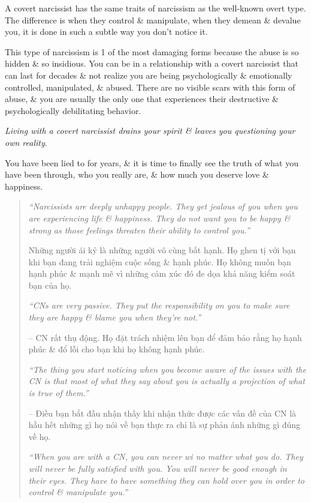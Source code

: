 \documentclass{article}
\begin{document}
\begin{enumerate}
	A covert narcissist has the same traits of narcissism as the well-known overt type. The difference is when they control \& manipulate, when they demean \& devalue you, it is done in such a subtle way you don't notice it.
	
	This type of narcissism is 1 of the most damaging forms because the abuse is so hidden \& so insidious. You can be in a relationship with a covert narcissist that can last for decades \& not realize you are being psychologically \& emotionally controlled, manipulated, \& abused. There are no visible scars with this form of abuse, \& you are usually the only one that experiences their destructive \& psychologically debilitating behavior.
	
	{\it Living with a covert narcissist drains your spirit \& leaves you questioning your own reality}.
	
	You have been lied to for years, \& it is time to finally see the truth of what you have been through, who you really are, \& how much you deserve love \& happiness.
	\begin{quotation}
		{\it``Narcissists are deeply unhappy people. They get jealous of you when you are experiencing life \& happiness. They do not want you to be happy \& strong as those feelings threaten their ability to control you.''}
		
		Những người ái kỷ là những người vô cùng bất hạnh. Họ ghen tị với bạn khi bạn đang trải nghiệm cuộc sống \& hạnh phúc. Họ không muốn bạn hạnh phúc \& mạnh mẽ vì những cảm xúc đó đe dọa khả năng kiểm soát bạn của họ.
		
		{\it``CNs are very passive. They put the responsibility on you to make sure they are happy \& blame you when they're not.''}
		
		-- CN rất thụ động. Họ đặt trách nhiệm lên bạn để đảm bảo rằng họ hạnh phúc \& đổ lỗi cho bạn khi họ không hạnh phúc.		
		
		{\it``The thing you start noticing when you become aware of the issues with the CN is that most of what they say about you is actually a projection of what is true of them.''}
		
		-- Điều bạn bắt đầu nhận thấy khi nhận thức được các vấn đề của CN là hầu hết những gì họ nói về bạn thực ra chỉ là sự phản ánh những gì đúng về họ.
		
		{\it``When you are with a CN, you can never wi no matter what you do. They will never be fully satisfied with you. You will never be good enough in their eyes. They have to have something they can hold over you in order to control \& manipulate you.''}
		

\end{quotation}
\end{enumerate}
\end{document}
